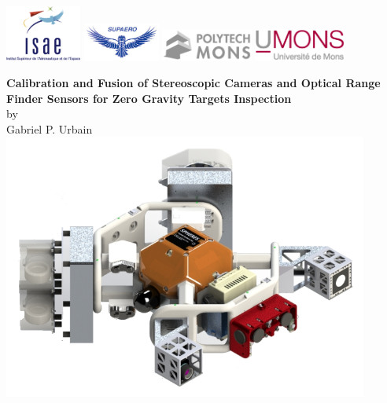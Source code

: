 \documentclass[12pt,twoside]{article}
\begin{document}
\begin{titlepage}
\includegraphics[width=2.5cm]{img/isae.png}
\hspace{60pt}
\includegraphics[width=2.5cm]{img/supaero.jpg}
\hspace{90pt}
\includegraphics[width=3cm]{img/fpms.jpg}
\hspace{50pt}
\includegraphics[width=3cm]{img/umons.eps}
\begin{center}
\vspace{40pt}
{\Large \bf Calibration and Fusion of Stereoscopic Cameras and Optical Range Finder Sensors for Zero Gravity Targets Inspection}\\
\vspace{10pt}
by\\
\vspace{10pt}
{\Large Gabriel P. Urbain}\\
\vspace{20pt}
\includegraphics[width=12cm]{img/inspect.png}\\

\end{center}
\end{titlepage}
\end{document}
